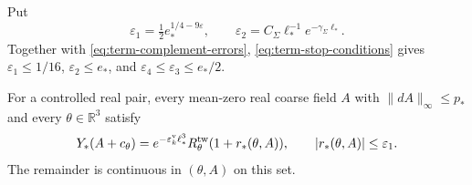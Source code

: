 \documentclass[11pt,letterpaper,reqno]{amsart}
\newcommand{\R}{\mathbb R}
\begin{document}
Put
\begin{equation}\label{eq:term-remainder-errors}
 \varepsilon_1=\tfrac12e_*^{1/4-9\varepsilon},\qquad
 \varepsilon_2=C_\Sigma\ell_*^{-1}e^{-\gamma_\Sigma\ell_*}.
\end{equation}
Together with \eqref{eq:term-complement-errors},
\eqref{eq:term-stop-conditions} gives
$\varepsilon_1\le1/16$, $\varepsilon_2\le e_*$,
and $\varepsilon_4\le\varepsilon_3\le e_*/2$.

\begin{proposition}\label{prop:term-remainder}
For a controlled real pair, every mean-zero real coarse
field $A$ with $\|dA\|_\infty\le p_*$ and every
$\theta\in\R^3$ satisfy
\begin{equation}\label{eq:term-density-remainder}
 Y_*(A+c_\theta)
     =e^{-\varepsilon_k^{\rm v}\ell_*^3}
                R_\theta^{\rm tw}(1+r_*(\theta,A)),
                         \qquad |r_*(\theta,A)|\le\varepsilon_1.
\end{equation}
The remainder is continuous in $(\theta,A)$ on this set.
\end{proposition}
\end{document}
